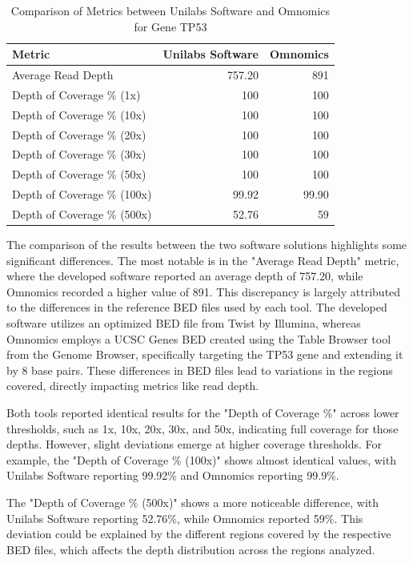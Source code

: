 \begin{table}[]
    \centering
    \caption{Comparison of Metrics between Unilabs Software and Omnomics for Gene TP53}
    \label{tab:omnomicsVSunilabs}
    \begin{tabular}{lrr}
    \textbf{Metric}                      & \textbf{Unilabs Software} & \textbf{Omnomics} \\
    \hline
    Average Read Depth          & 757.20           & 891      \\
    Depth of Coverage \% (1x)   & 100              & 100      \\
    Depth of Coverage \% (10x)  & 100              & 100      \\
    Depth of Coverage \% (20x)  & 100              & 100      \\
    Depth of Coverage \% (30x)  & 100              & 100      \\
    Depth of Coverage \% (50x)  & 100              & 100      \\
    Depth of Coverage \% (100x) & 99.92            & 99.90     \\
    Depth of Coverage \% (500x) & 52.76            & 59      
    \end{tabular}
\end{table}

The comparison of the results between the two software solutions highlights some significant differences. The most notable is in the "Average Read Depth" metric, where the developed software reported an average depth of 757.20, while Omnomics recorded a higher value of 891. This discrepancy is largely attributed to the differences in the reference BED files used by each tool. The developed software utilizes an optimized BED file from Twist by Illumina, whereas Omnomics employs a UCSC Genes BED created using the Table Browser tool from the Genome Browser, specifically targeting the TP53 gene and extending it by 8 base pairs. These differences in BED files lead to variations in the regions covered, directly impacting metrics like read depth.

Both tools reported identical results for the "Depth of Coverage \%" across lower thresholds, such as 1x, 10x, 20x, 30x, and 50x, indicating full coverage for those depths. However, slight deviations emerge at higher coverage thresholds. For example, the "Depth of Coverage \% (100x)" shows almost identical values, with Unilabs Software reporting 99.92\% and Omnomics reporting 99.9\%.

The "Depth of Coverage \% (500x)" shows a more noticeable difference, with Unilabs Software reporting 52.76\%, while Omnomics reported 59\%. This deviation could be explained by the different regions covered by the respective BED files, which affects the depth distribution across the regions analyzed.

